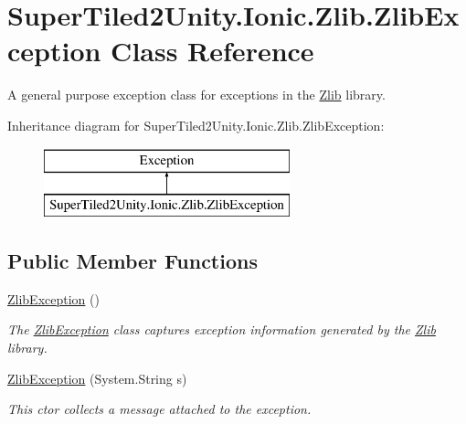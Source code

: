 \hypertarget{class_super_tiled2_unity_1_1_ionic_1_1_zlib_1_1_zlib_exception}{}\section{Super\+Tiled2\+Unity.\+Ionic.\+Zlib.\+Zlib\+Exception Class Reference}
\label{class_super_tiled2_unity_1_1_ionic_1_1_zlib_1_1_zlib_exception}


A general purpose exception class for exceptions in the \mbox{\hyperlink{namespace_super_tiled2_unity_1_1_ionic_1_1_zlib}{Zlib}} library.  


Inheritance diagram for Super\+Tiled2\+Unity.\+Ionic.\+Zlib.\+Zlib\+Exception\+:\begin{figure}[H]
\begin{center}
\leavevmode
\includegraphics[height=2.000000cm]{class_super_tiled2_unity_1_1_ionic_1_1_zlib_1_1_zlib_exception}
\end{center}
\end{figure}
\subsection*{Public Member Functions}
\begin{DoxyCompactItemize}
\item 
\mbox{\hyperlink{class_super_tiled2_unity_1_1_ionic_1_1_zlib_1_1_zlib_exception_abc03aa47a514ef237f8a6f4fd629ed22}{Zlib\+Exception}} ()
\begin{DoxyCompactList}\small\item\em The \mbox{\hyperlink{class_super_tiled2_unity_1_1_ionic_1_1_zlib_1_1_zlib_exception}{Zlib\+Exception}} class captures exception information generated by the \mbox{\hyperlink{namespace_super_tiled2_unity_1_1_ionic_1_1_zlib}{Zlib}} library. \end{DoxyCompactList}\item 
\mbox{\hyperlink{class_super_tiled2_unity_1_1_ionic_1_1_zlib_1_1_zlib_exception_ad1ddc4d7726d808e1806d76e194fe7c1}{Zlib\+Exception}} (System.\+String s)
\begin{DoxyCompactList}\small\item\em This ctor collects a message attached to the exception. \end{DoxyCompactList}\end{DoxyCompactItemize}


